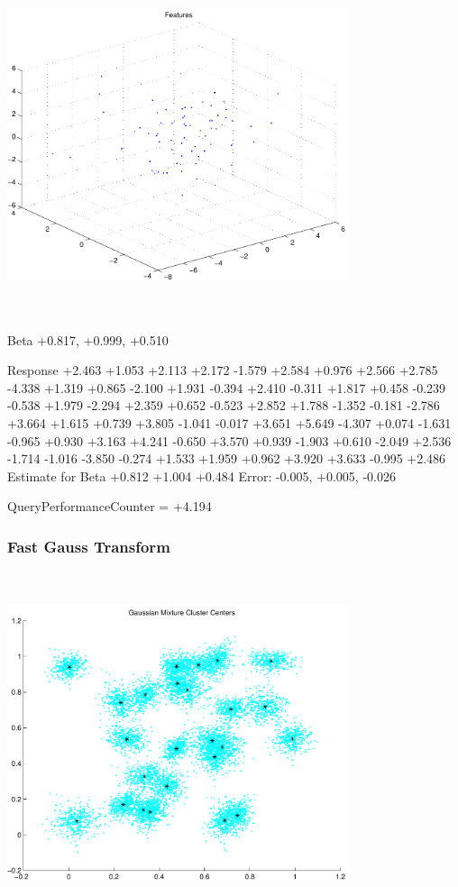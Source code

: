 \documentclass[9pt]{article}
\theoremstyle{plain}
\theoremstyle{definition}
\theoremstyle{remark}
\numberwithin{equation}{section}
\begin{document}
\includegraphics[width=10.0cm,height=10.0cm]{regression_features.pdf}

Beta
+0.817, +0.999, +0.510

Response
+2.463
+1.053
+2.113
+2.172
-1.579
+2.584
+0.976
+2.566
+2.785
-4.338
+1.319
+0.865
-2.100
+1.931
-0.394
+2.410
-0.311
+1.817
+0.458
-0.239
-0.538
+1.979
-2.294
+2.359
+0.652
-0.523
+2.852
+1.788
-1.352
-0.181
-2.786
+3.664
+1.615
+0.739
+3.805
-1.041
-0.017
+3.651
+5.649
-4.307
+0.074
-1.631
-0.965
+0.930
+3.163
+4.241
-0.650
+3.570
+0.939
-1.903
+0.610
-2.049
+2.536
-1.714
-1.016
-3.850
-0.274
+1.533
+1.959
+0.962
+3.920
+3.633
-0.995
+2.486
Estimate for Beta
+0.812
+1.004
+0.484
Error:
-0.005, +0.005, -0.026


QueryPerformanceCounter  =  +4.194
\subsubsection{Fast Gauss Transform}
\includegraphics[width=10.0cm,height=10.0cm]{GaussianMixture_ClusterCenters25_Centers.pdf}
\end{document}
